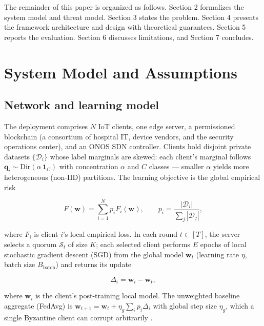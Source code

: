 \documentclass[cmc,article,submit,moreauthors,pdftex]{Definitions/tsp}
\begin{document}
The remainder of this paper is organized as follows. Section 2 formalizes the system model and threat model. Section 3 states the problem. Section 4 presents the framework architecture and design with theoretical guarantees. Section 5 reports the evaluation. Section 6 discusses limitations, and Section 7 concludes.

\section{System Model and Assumptions}\label{sec:system-model-and-assumptions}

\subsection{Network and learning model}\label{sec:network-and-learning-model}

The deployment comprises $N$ IoT clients, one edge server, a permissioned blockchain (a consortium of hospital IT, device vendors, and the security operations center), and an ONOS SDN controller. Clients hold disjoint private datasets $\{\mathcal{D}_i\}$ whose label marginals are skewed: each client's marginal follows $\mathbf{q}_i \sim \mathrm{Dir}(\alpha\,\mathbf{1}_C)$ with concentration $\alpha$ and $C$ classes --- smaller $\alpha$ yields more heterogeneous (non-IID) partitions. The learning objective is the global empirical risk

\begin{equation}
F(\mathbf{w}) = \sum_{i=1}^{N} p_i F_i(\mathbf{w}), \qquad p_i = \frac{|\mathcal{D}_i|}{\sum_j |\mathcal{D}_j|},
\tag{1}
\end{equation}

where $F_i$ is client $i$'s local empirical loss. In each round $t \in [T]$, the server selects a quorum $\mathcal{S}_t$ of size $K$; each selected client performs $E$ epochs of local stochastic gradient descent (SGD) from the global model $\mathbf{w}_t$ (learning rate $\eta$, batch size $B_{\mathrm{batch}}$) and returns its update

\begin{equation}
\Delta_i = \mathbf{w}_i - \mathbf{w}_t,
\tag{2}
\end{equation}

where $\mathbf{w}_i$ is the client's post-training local model. The unweighted baseline aggregate (FedAvg) is $\mathbf{w}_{t+1} = \mathbf{w}_t + \eta_g\sum_i p_i\Delta_i$ with global step size $\eta_g$, which a single Byzantine client can corrupt arbitrarily \cite{ref-12}.
\end{document}
